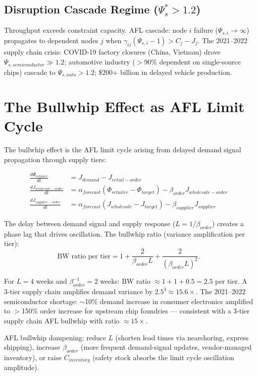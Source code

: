 \documentclass[11pt]{article}
\begin{document}
\subsection{Disruption Cascade Regime ($\Psi_s^* > 1.2$)}

Throughput exceeds constraint capacity. AFL cascade: node $i$ failure ($\Psi_{s,i} \to \infty$)
propagates to dependent nodes $j$ when $\gamma_{ij}(\Psi_{s,i} - 1) > C_j - J_j$. The 2021--2022
supply chain crisis: COVID-19 factory closures (China, Vietnam) drove $\Psi_{s,semiconductor}
\gg 1.2$; automotive industry ($>$90\% dependent on single-source chips) cascade to $\Psi_{s,auto}
> 1.2$; \$200+ billion in delayed vehicle production.

\section{The Bullwhip Effect as AFL Limit Cycle}

The bullwhip effect is the AFL limit cycle arising from delayed demand signal propagation through
supply tiers:

\begin{align}
\frac{d\Phi_{retailer}}{dt} &= J_{demand} - J_{retail-order} \\
\frac{dJ_{wholesale-order}}{dt} &= \alpha_{forecast}(\Phi_{retailer} - \Phi_{target}) - \beta_{order} J_{wholesale-order} \\
\frac{dJ_{supplier-order}}{dt} &= \alpha_{forecast}(J_{wholesale} - J_{target}) - \beta_{supplier} J_{supplier}
\end{align}

The delay between demand signal and supply response ($L = 1/\beta_{order}$) creates a phase
lag that drives oscillation. The bullwhip ratio (variance amplification per tier):
\begin{equation}
\text{BW ratio per tier} = 1 + \frac{2}{\beta_{order} L} + \frac{2}{(\beta_{order} L)^2}.
\end{equation}

For $L = 4$ weeks and $\beta_{order}^{-1} = 2$ weeks: BW ratio $\approx 1 + 1 + 0.5 = 2.5$
per tier. A 3-tier supply chain amplifies demand variance by $2.5^3 \approx 15.6\times$. The
2021--2022 semiconductor shortage: $\sim$10\% demand increase in consumer electronics amplified
to $>$150\% order increase for upstream chip foundries --- consistent with a 3-tier supply
chain AFL bullwhip with ratio $\approx 15\times$.

AFL bullwhip dampening: reduce $L$ (shorten lead times via nearshoring, express shipping),
increase $\beta_{order}$ (more frequent demand-signal updates, vendor-managed inventory), or
raise $C_{inventory}$ (safety stock absorbs the limit cycle oscillation amplitude).
\end{document}
